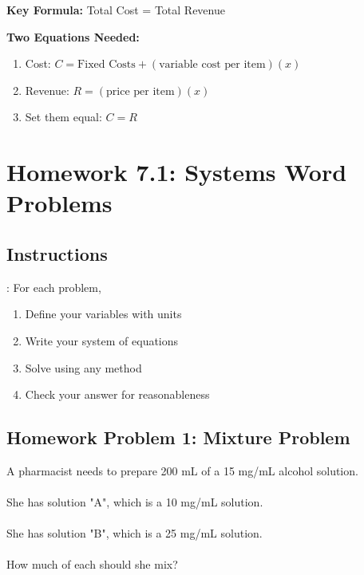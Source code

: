 \documentclass[12pt]{article}
\begin{document}
		    \textbf{Key Formula:}
			Total Cost = Total Revenue
		
		    \textbf{Two Equations Needed:}
			\begin{enumerate}
				\item Cost: $C = \text{Fixed Costs} + (\text{variable cost per item})(x)$
				\item Revenue: $R = (\text{price per item})(x)$
				\item Set them equal: $C = R$
			\end{enumerate}
	
	        \newpage
	
	\section*{Homework 7.1: Systems Word Problems}
	
	    \subsection*{Instructions}:
	        For each problem,
	        \begin{enumerate}
                \item Define your variables with units
                \item Write your system of equations
                \item Solve using any method
                \item Check your answer for reasonableness
            \end{enumerate}
            
	        \newpage
	
        \subsection*{Homework Problem 1: Mixture Problem}
            
            A pharmacist needs to prepare 200 mL of a 15 mg/mL alcohol solution.\\\\
            She has solution "A", which is a 10 mg/mL solution.\\\\
            She has solution "B", which is a 25 mg/mL solution.\\\\
            How much of each should she mix?\\
        
\end{document}
